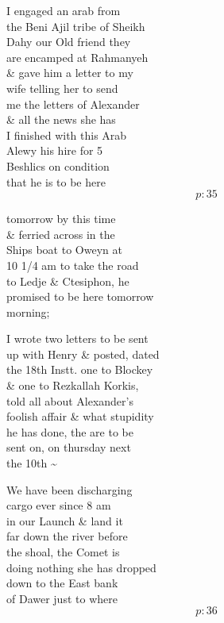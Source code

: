 \documentclass{report}
\begin{document}
	\par{
 	I engaged an arab from\ \\the Beni Ajil tribe of Sheikh\ \\Dahy our Old friend they\ \\are encamped at Rahmanyeh\ \\\& gave him a letter to my\ \\wife telling her to send\ \\me the letters of Alexander\ \\\& all the news she has\ \\I finished with this Arab\ \\Alewy his hire for 5\ \\Beshlics on condition\ \\that he is to be here\ \\
  \[p: 35 \]

	}


	\par{
 	tomorrow by this time\ \\\& ferried across in the\ \\Ships boat to Oweyn at\ \\10 1/4 am to take the road\ \\to Ledje \& Ctesiphon, he\ \\promised to be here tomorrow\ \\morning;\ \\
	}

	\par{
 	I wrote two letters to be sent\ \\up with Henry \& posted, dated\ \\the 18th Instt. one to Blockey\ \\\& one to Rezkallah Korkis,\ \\told all about Alexander's\ \\foolish affair \& what stupidity\ \\he has done, the are to be\ \\sent on, on thursday next\ \\the 10th \~{}\ \\
	}

	\par{
 	We have been discharging\ \\cargo ever since 8 am\ \\in our Launch \& land it\ \\far down the river before\ \\the shoal, the Comet is\ \\doing nothing she has dropped\ \\down to the East bank\ \\of Dawer just to where\ \\
  \[p: 36 \]

	}
\end{document}
